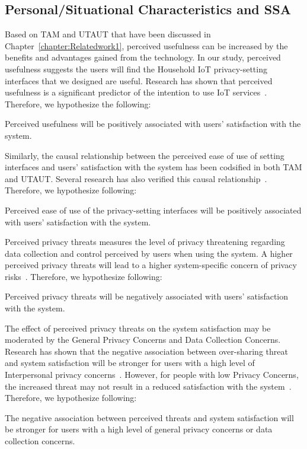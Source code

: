\subsection{Personal/Situational Characteristics and SSA}
Based on TAM and UTAUT that have been discussed in Chapter~\ref{chapter:Relatedwork1}, perceived usefulness can be increased by the benefits and advantages gained from the technology. In our study, perceived usefulness suggests the users will find the Household IoT privacy-setting interfaces that we designed are useful. Research has shown that perceived usefulness is a significant predictor of the intention to use IoT services~\cite{coughlan2012exploring}. Therefore, we hypothesize the following:
\theoremgroup
\begin{theorem}
	Perceived usefulness will be positively associated with users' satisfaction with the system.
\end{theorem}

Similarly, the causal relationship between the perceived ease of use of setting interfaces and users' satisfaction with the system has been codsified in both TAM and UTAUT. Several research has also verified this causal relationship~\cite{gao2014unified, dong2017understanding, choi2016smartwatch}. Therefore, we hypothesize following:
\theoremgroup
\begin{theorem}
	Perceived ease of use of the privacy-setting interfaces will be positively associated with users' satisfaction with the system.
\end{theorem}

Perceived privacy threats measures the level of privacy threatening regarding data collection and control perceived by users when using the system. A higher perceived privacy threats will lead to a higher system-specific concern of privacy risks~\cite{knijnenburg2013persuasive, knijnenburg2014increasing}. Therefore, we hypothesize following:
\theoremgroup
\begin{theorem}
	Perceived privacy threats will be negatively associated with users' satisfaction with the system.
\end{theorem}

The effect of perceived privacy threats on the system satisfaction may be moderated by the General Privacy Concerns and Data Collection Concerns. Research has shown that the negative association between over-sharing threat and system satisfaction will be stronger for users with a high level of Interpersonal privacy concerns~\cite{knijnenburg2014increasing}. However, for people with low Privacy  Concerns, the increased threat may not result in a reduced satisfaction with the system~\cite{hann2007overcoming, krasnova2009investigating}. Therefore, we hypothesize following:
\begin{theorem}
	The negative association between perceived threats and system satisfaction will be stronger for users with a high level of general privacy concerns or data collection concerns.
\end{theorem}

